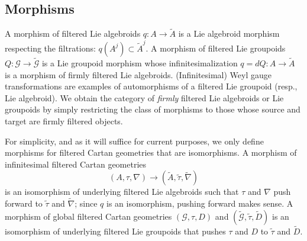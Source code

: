\documentclass[leqno,12pt]{amsart} %
\begin{document}
\subsection{Morphisms}\label{morphisms}
A {\df morphism} of filtered Lie algebroids $q \colon A \rightarrow \tilde A$ is a Lie
algebroid morphism respecting the filtrations: $q(A^j) \subset \tilde A^j$. A {\df
  morphism} of filtered Lie groupoids
$Q \colon {\mathcal G} \rightarrow \tilde {\mathcal G} $ is a Lie groupoid morphism whose
infinitesimalization $q=dQ \colon A \rightarrow \tilde A$ is a morphism of firmly filtered
Lie algebroids. (Infinitesimal) Weyl gauge transformations are examples of automorphisms
of a filtered Lie groupoid (resp., Lie algebroid). We obtain the category of {\em firmly}
filtered Lie algebroids or Lie groupoids by simply restricting the class of morphisms to
those whose source and target are firmly filtered objects.

For simplicity, and as it will suffice for current purposes, we only define morphisms for
filtered Cartan geometries that are isomorphisms. A {\df morphism} of infinitesimal filtered
Cartan geometries
$$(A, \tau, \nabla) \rightarrow (\tilde A, \tilde \tau, \tilde \nabla)$$ is an isomorphism of
underlying filtered Lie algebroids such that $\tau$ and $\nabla $ push forward to
$\tilde \tau $ and $\tilde \nabla $; since $q$ is an isomorphism, pushing forward makes
sense.  A {\df morphism} of global filtered Cartan geometries $({\mathcal G}, \tau, D)$
and $(\tilde {\mathcal G}, \tilde \tau, \tilde D)$ is an isomorphism of underlying
filtered Lie groupoids that pushes $\tau $ and $D $ to $\tilde \tau$
and $\tilde D $.
\end{document}

